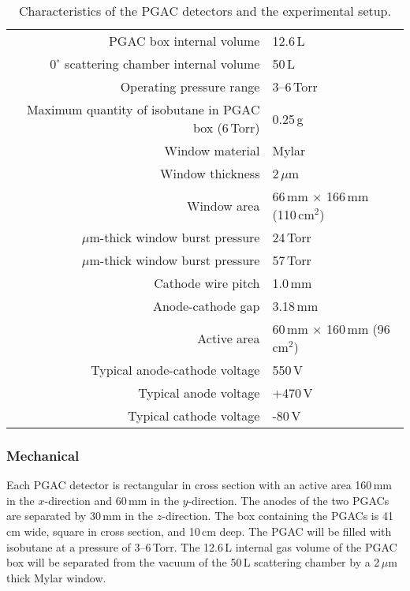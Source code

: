\begin{table}[t]
\begin{center}
\begin{tabulary}{1.0\textwidth}{R|L} 
\raggedleft PGAC box internal volume & 12.6\,L\\
\raggedleft $0^\circ$ scattering chamber internal volume & 50\,L\\
\raggedleft Operating pressure range&3--6\,Torr\\
\raggedleft Maximum quantity of isobutane in PGAC box (6\,Torr)&0.25\,g\\
\hline
\raggedleft Window material &Mylar\\
\raggedleft Window thickness&2\,$\mu$m\\
\raggedleft Window area& 66\,mm $\times$ 166\,mm (110\,cm$^2$)\\
\,$\mu$m-thick window burst pressure &24\,Torr\\
\,$\mu$m-thick window burst pressure &57\,Torr\\
\hline
\raggedleft Cathode wire pitch&1.0\,mm\\
\raggedleft Anode-cathode gap&3.18\,mm\\
\raggedleft Active area&60\,mm $\times$ 160\,mm (96\,cm$^2$)\\
\hline
\raggedleft Typical anode-cathode voltage &550\,V\\
\raggedleft Typical anode voltage &+470\,V\\
\raggedleft Typical cathode voltage &-80\,V\\
\end{tabulary}
\end{center}
\caption{Characteristics of the PGAC detectors and the experimental setup.}
\label{detector}
\end{table}

\subsubsection{Mechanical}
Each PGAC detector is rectangular in cross section with an active area 160\,mm in the $x$-direction and 60\,mm in the $y$-direction. The anodes of the two PGACs are separated by 30\,mm in the $z$-direction. The box containing the PGACs is 41\,cm wide, square in cross section, and 10\,cm deep.
The PGAC will be filled with isobutane at a pressure of 3--6\,Torr. The 12.6\,L internal gas volume of the PGAC box will be separated from the vacuum of the 50\,L scattering chamber by a 2\,$\mu$m thick Mylar window. 

